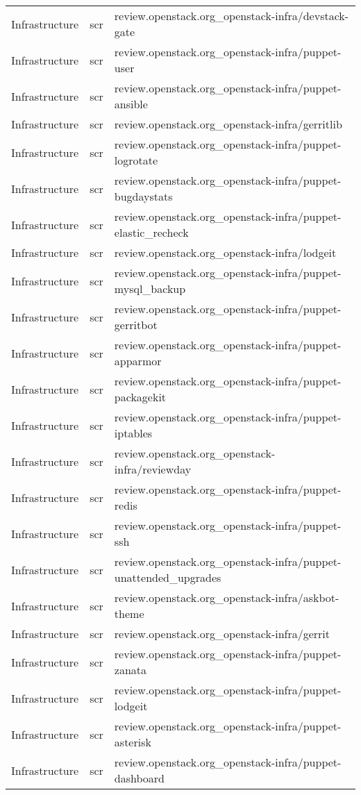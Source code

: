\begin{center}
\begin{longtable}{|p{4cm}|p{1cm}|p{10cm}|}
Infrastructure&scr&review.openstack.org\_openstack-infra/devstack-gate\\
Infrastructure&scr&review.openstack.org\_openstack-infra/puppet-user\\
Infrastructure&scr&review.openstack.org\_openstack-infra/puppet-ansible\\
Infrastructure&scr&review.openstack.org\_openstack-infra/gerritlib\\
Infrastructure&scr&review.openstack.org\_openstack-infra/puppet-logrotate\\
Infrastructure&scr&review.openstack.org\_openstack-infra/puppet-bugdaystats\\
Infrastructure&scr&review.openstack.org\_openstack-infra/puppet-elastic\_recheck\\
Infrastructure&scr&review.openstack.org\_openstack-infra/lodgeit\\
Infrastructure&scr&review.openstack.org\_openstack-infra/puppet-mysql\_backup\\
Infrastructure&scr&review.openstack.org\_openstack-infra/puppet-gerritbot\\
Infrastructure&scr&review.openstack.org\_openstack-infra/puppet-apparmor\\
Infrastructure&scr&review.openstack.org\_openstack-infra/puppet-packagekit\\
Infrastructure&scr&review.openstack.org\_openstack-infra/puppet-iptables\\
Infrastructure&scr&review.openstack.org\_openstack-infra/reviewday\\
Infrastructure&scr&review.openstack.org\_openstack-infra/puppet-redis\\
Infrastructure&scr&review.openstack.org\_openstack-infra/puppet-ssh\\
Infrastructure&scr&review.openstack.org\_openstack-infra/puppet-unattended\_upgrades\\
Infrastructure&scr&review.openstack.org\_openstack-infra/askbot-theme\\
Infrastructure&scr&review.openstack.org\_openstack-infra/gerrit\\
Infrastructure&scr&review.openstack.org\_openstack-infra/puppet-zanata\\
Infrastructure&scr&review.openstack.org\_openstack-infra/puppet-lodgeit\\
Infrastructure&scr&review.openstack.org\_openstack-infra/puppet-asterisk\\
Infrastructure&scr&review.openstack.org\_openstack-infra/puppet-dashboard\\

\end{longtable}
\end{center}
